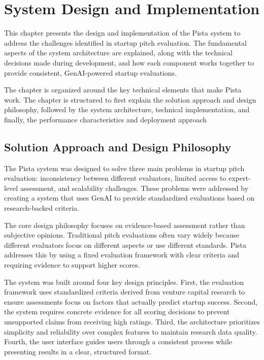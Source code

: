\chapter{System Design and Implementation} \label{ch:problem-solution}

This chapter presents the design and implementation of the Pista system to address the challenges identified in startup pitch evaluation. The fundamental aspects of the system architecture are explained, along with the technical decisions made during development, and how each component works together to provide consistent, GenAI-powered startup evaluations.

The chapter is organized around the key technical elements that make Pista work. The chapter is structured to first explain the solution approach and design philosophy, followed by the system architecture, technical implementation, and finally, the performance characteristics and deployment approach

\section{Solution Approach and Design Philosophy} \label{sec:solution-approach}

The Pista system was designed to solve three main problems in startup pitch evaluation: inconsistency between different evaluators, limited access to expert-level assessment, and scalability challenges. These problems were addressed by creating a system that uses GenAI to provide standardized evaluations based on research-backed criteria.

The core design philosophy focuses on evidence-based assessment rather than subjective opinions. Traditional pitch evaluations often vary widely because different evaluators focus on different aspects or use different standards. Pista addresses this by using a fixed evaluation framework with clear criteria and requiring evidence to support higher scores.

The system was built around four key design principles. First, the evaluation framework uses standardized criteria derived from venture capital research to ensure assessments focus on factors that actually predict startup success. Second, the system requires concrete evidence for all scoring decisions to prevent unsupported claims from receiving high ratings. Third, the architecture prioritizes simplicity and reliability over complex features to maintain research data quality. Fourth, the user interface guides users through a consistent process while presenting results in a clear, structured format.

